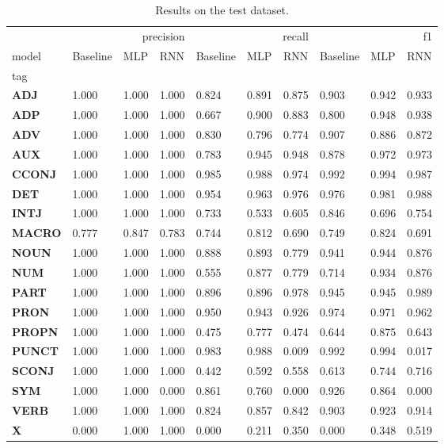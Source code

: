 \begin{table}
\caption{Results on the test dataset.}
\label{tab::ex_2_test}
\begin{tabular}{|l||l||l||l||l||l||l||l||l||l|}
\toprule
 & \multicolumn{3}{r}{precision} & \multicolumn{3}{r}{recall} & \multicolumn{3}{r}{f1} \\
model & Baseline & MLP & RNN & Baseline & MLP & RNN & Baseline & MLP & RNN \\
tag &  &  &  &  &  &  &  &  &  \\
\midrule
\textbf{ADJ} & 1.000 & 1.000 & 1.000 & 0.824 & 0.891 & 0.875 & 0.903 & 0.942 & 0.933 \\
\textbf{ADP} & 1.000 & 1.000 & 1.000 & 0.667 & 0.900 & 0.883 & 0.800 & 0.948 & 0.938 \\
\textbf{ADV} & 1.000 & 1.000 & 1.000 & 0.830 & 0.796 & 0.774 & 0.907 & 0.886 & 0.872 \\
\textbf{AUX} & 1.000 & 1.000 & 1.000 & 0.783 & 0.945 & 0.948 & 0.878 & 0.972 & 0.973 \\
\textbf{CCONJ} & 1.000 & 1.000 & 1.000 & 0.985 & 0.988 & 0.974 & 0.992 & 0.994 & 0.987 \\
\textbf{DET} & 1.000 & 1.000 & 1.000 & 0.954 & 0.963 & 0.976 & 0.976 & 0.981 & 0.988 \\
\textbf{INTJ} & 1.000 & 1.000 & 1.000 & 0.733 & 0.533 & 0.605 & 0.846 & 0.696 & 0.754 \\
\textbf{MACRO} & 0.777 & 0.847 & 0.783 & 0.744 & 0.812 & 0.690 & 0.749 & 0.824 & 0.691 \\
\textbf{NOUN} & 1.000 & 1.000 & 1.000 & 0.888 & 0.893 & 0.779 & 0.941 & 0.944 & 0.876 \\
\textbf{NUM} & 1.000 & 1.000 & 1.000 & 0.555 & 0.877 & 0.779 & 0.714 & 0.934 & 0.876 \\
\textbf{PART} & 1.000 & 1.000 & 1.000 & 0.896 & 0.896 & 0.978 & 0.945 & 0.945 & 0.989 \\
\textbf{PRON} & 1.000 & 1.000 & 1.000 & 0.950 & 0.943 & 0.926 & 0.974 & 0.971 & 0.962 \\
\textbf{PROPN} & 1.000 & 1.000 & 1.000 & 0.475 & 0.777 & 0.474 & 0.644 & 0.875 & 0.643 \\
\textbf{PUNCT} & 1.000 & 1.000 & 1.000 & 0.983 & 0.988 & 0.009 & 0.992 & 0.994 & 0.017 \\
\textbf{SCONJ} & 1.000 & 1.000 & 1.000 & 0.442 & 0.592 & 0.558 & 0.613 & 0.744 & 0.716 \\
\textbf{SYM} & 1.000 & 1.000 & 0.000 & 0.861 & 0.760 & 0.000 & 0.926 & 0.864 & 0.000 \\
\textbf{VERB} & 1.000 & 1.000 & 1.000 & 0.824 & 0.857 & 0.842 & 0.903 & 0.923 & 0.914 \\
\textbf{X} & 0.000 & 1.000 & 1.000 & 0.000 & 0.211 & 0.350 & 0.000 & 0.348 & 0.519 \\
\bottomrule
\end{tabular}
\end{table}
